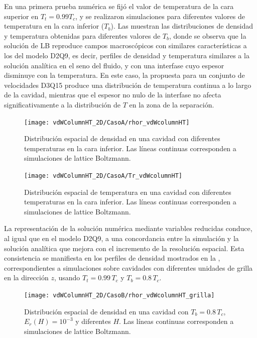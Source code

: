 En una primera prueba num\'erica se fij\'o el valor de temperatura de la cara superior en $T_t = 0.99 T_c$, y se realizaron simulaciones para diferentes valores de temperatura en la cara inferior ($T_b$). Las  muestran las distribuciones de densidad y temperatura obtenidas para diferentes valores de $T_b$, donde se observa que la soluci\'on de LB reproduce campos macrosc\'opicos con similares caracter\'isticas a los del modelo D2Q9, es decir, perfiles de densidad y temperatura similares a la soluci\'on anal\'itica en el seno del fluido, y con una interfase cuyo espesor disminuye con la temperatura. En este caso, la \lbe{} propuesta para un conjunto de velocidades D3Q15 produce una distribuci\'on de temperatura continua a lo largo de la cavidad, mientras que el espesor no nulo de la interfase no afecta significativamente a la distribuci\'on de $T$ en la zona de la separaci\'on.

\begin{figure}[ht]
	\centering
	\texttt{[image: vdWColumnHT\_2D/CasoA/rhor\_vdWcolumnHT]}
	\caption{Distribuci\'on espacial de densidad en una cavidad con diferentes temperaturas en la cara inferior. Las l\'ineas continuas corresponden a simulaciones de lattice Boltzmann.}
	\label{fig:vdWColumnHT_rhor_3D}
\end{figure}

\begin{figure}[ht]
	\centering
	\texttt{[image: vdWColumnHT\_2D/CasoA/Tr\_vdWcolumnHT]}
	\caption{Distribuci\'on espacial de temperatura en una cavidad con diferentes temperaturas en la cara inferior. Las l\'ineas continuas corresponden a simulaciones de lattice Boltzmann.}
	\label{fig:vdWColumnHT_Tr_3D}
\end{figure}
\FloatBarrier

La representaci\'on de la soluci\'on num\'erica mediante variables reducidas conduce, al igual que en el modelo D2Q9, a una concordancia entre la simulaci\'on y la soluci\'on anal\'itica que mejora con el incremento de la resoluci\'on espacial. Esta consistencia se manifiesta en los perfiles de densidad mostrados en la , correspondientes a simulaciones sobre cavidades con diferentes unidades de grilla en la direcci\'on $z$, usando $T_t = 0.99 \, T_c$ y $T_b = 0.8 \, T_c$.

\begin{figure}[ht]
	\centering
	\texttt{[image: vdWColumnHT\_2D/CasoB/rhor\_vdWcolumnHT\_grilla]}
	\caption{Distribuci\'on espacial de densidad en una cavidad con $T_b = 0.8 \, T_c$, $E_r(H)=10^{-3}$ y diferentes $H$. Las l\'ineas continuas corresponden a simulaciones de lattice Boltzmann.}
	\label{fig:vdWColumnHT_rhor_grilla_3D}
\end{figure}


